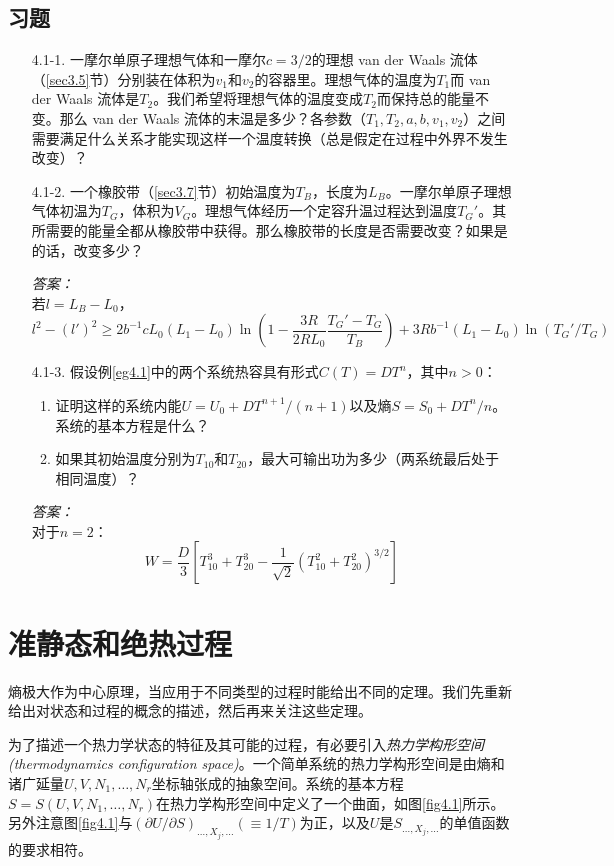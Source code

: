 \subsection*{习题}
\begin{itemize}
\item[4.1-1.] 一摩尔单原子理想气体和一摩尔$c=3/2$的理想 van der Waals 流体（\ref{sec3.5}节）分别装在体积为$v_1$和$v_2$的容器里。理想气体的温度为$T_1$而 van der Waals 流体是$T_2$。我们希望将理想气体的温度变成$T_2$而保持总的能量不变。那么 van der Waals 流体的末温是多少？各参数（$T_1,T_2,a,b,v_1,v_2$）之间需要满足什么关系才能实现这样一个温度转换（总是假定在过程中外界不发生改变）？
\item[4.1-2.] 一个橡胶带（\ref{sec3.7}节）初始温度为$T_B$，长度为$L_{B}$。一摩尔单原子理想气体初温为$T_G$，体积为$V_G$。理想气体经历一个定容升温过程达到温度$T_G'$。其所需要的能量全都从橡胶带中获得。那么橡胶带的长度是否需要改变？如果是的话，改变多少？
\begin{flushright}
{\it 答案：}\\
若$l=L_B-L_0$，
\[
l^2-(l')^2\ge 2b^{-1}cL_0(L_1-L_0)\ln\left(1-\frac{3R}{2RL_0}\frac{T_G'-T_G}{T_B}\right)+3Rb^{-1}(L_1-L_0)\ln(T_G'/T_G)
\]
\end{flushright}
\item[4.1-3.] 假设例\ref{eg4.1}中的两个系统热容具有形式$C(T)=DT^n$，其中$n>0$：\\
\begin{enumerate}
\item 证明这样的系统内能$U=U_0+DT^{n+1}/(n+1)$以及熵$S=S_0+DT^n/n$。系统的基本方程是什么？
\item 如果其初始温度分别为$T_{10}$和$T_{20}$，最大可输出功为多少（两系统最后处于相同温度）？
\end{enumerate}
\begin{flushright}
{\it 答案：}\\
对于$n=2$：
\[
W=\frac{D}{3}\left[T_{10}^3+T_{20}^3-\frac{1}{\sqrt{2}}(T_{10}^2+T_{20}^2)^{3/2}\right]
\]
\end{flushright}
\end{itemize}

\section{准静态和绝热过程}\label{sec4.2}
熵极大作为中心原理，当应用于不同类型的过程时能给出不同的定理。我们先重新给出对状态和过程的概念的描述，然后再来关注这些定理。

为了描述一个热力学状态的特征及其可能的过程，有必要引入{\it 热力学构形空间(thermodynamics configuration space)}。一个简单系统的热力学构形空间是由熵和诸广延量$U, V, N_1,\dots ,N_r$坐标轴张成的抽象空间。系统的基本方程$S=S(U, V, N_1,\dots ,N_r)$在热力学构形空间中定义了一个曲面，如图\ref{fig4.1}所示。另外注意图\ref{fig4.1}与$(\partial U/\partial S)_{\dots , X_j,\dots}(\equiv 1/T)$为正，以及$U$是$S_{\dots , X_j,\dots}$的单值函数的要求相符。

